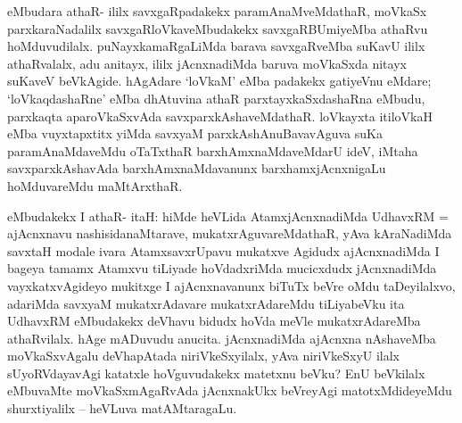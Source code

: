 
\begin{artha}
eMbudara athaR- ililx savxgaRpadakekx paramAnaMveMdathaR, moVkaSx parxkaraNadalilx savxgaRloVkaveMbudakekx savxgaRBUmiyeMba athaRvu hoMduvudilalx. puNayxkamaRgaLiMda barava savxgaRveMba suKavU ililx athaRvalalx, adu anitayx, ililx jAcnxnadiMda baruva moVkaSxda nitayx suKaveV beVkAgide. hAgAdare `loVkaM' eMba padakekx gatiyeVnu eMdare; `loVkaqdashaRne' eMba dhAtuvina athaR parxtayxkaSxdashaRna eMbudu, parxkaqta aparoVkaSxvAda savxparxkAshaveMdathaR. loVkayxta itiloVkaH eMba vuyxtapxtitx yiMda savxyaM parxkAshAnuBavavAguva suKa paramAnaMdaveMdu oTaTxthaR barxhAmxnaMdaveMdarU ideV, iMtaha savxparxkAshavAda barxhAmxnaMdavanunx barxhamxjAcnxnigaLu hoMduvareMdu maMtArxthaR. 
\end{artha}


\begin{artha}
eMbudakekx I athaR- itaH: hiMde heVLida AtamxjAcnxnadiMda UdhavxRM = ajAcnxnavu nashisidanaMtarave, mukatxrAguvareMdathaR, yAva kAraNadiMda savxtaH modale ivara AtamxsavxrUpavu mukatxve Agidudx ajAcnxnadiMda I bageya tamamx Atamxvu tiLiyade hoVdadxriMda mucicxdudx jAcnxnadiMda vayxkatxvAgideyo mukitxge I ajAcnxnavanunx biTuTx beVre oMdu taDeyilalxvo, adariMda savxyaM mukatxrAdavare mukatxrAdareMdu tiLiyabeVku ita UdhavxRM eMbudakekx deVhavu bidudx hoVda meVle mukatxrAdareMba athaRvilalx. hAge mADuvudu anucita. jAcnxnadiMda ajAcnxna nAshaveMba moVkaSxvAgalu deVhapAtada niriVkeSxyilalx, yAva niriVkeSxyU ilalx sUyoRVdayavAgi katatxle hoVguvudakekx matetxnu beVku? EnU beVkilalx eMbuvaMte moVkaSxmAgaRvAda jAcnxnakUkx beVreyAgi matotxMdideyeMdu shurxtiyalilx -- heVLuva matAMtaragaLu.
\end{artha}

